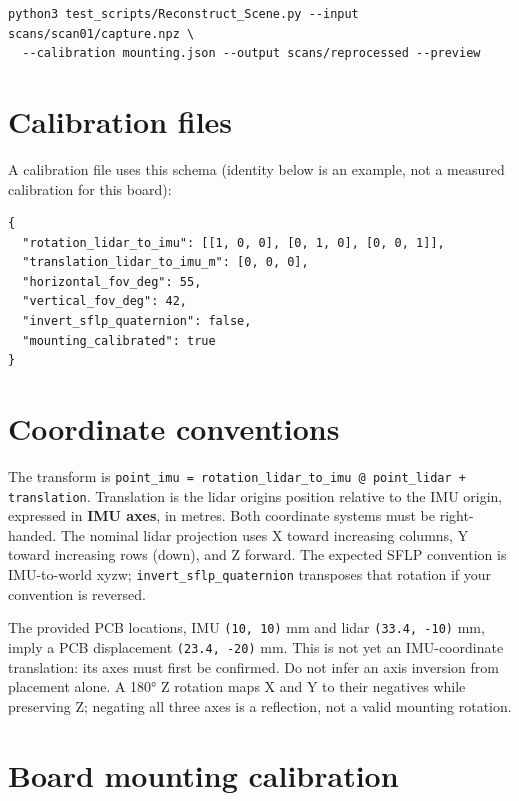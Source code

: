 \documentclass[10pt,a4paper,oneside]{report}
\begin{document}
\begin{verbatim}
python3 test_scripts/Reconstruct_Scene.py --input scans/scan01/capture.npz \
  --calibration mounting.json --output scans/reprocessed --preview
\end{verbatim}

\section{Calibration files}\label{wiki-tools-scene-reconstruction--calibration-files}

A calibration file uses this schema (identity below is an example, not a measured calibration for this board):

\begin{verbatim}
{
  "rotation_lidar_to_imu": [[1, 0, 0], [0, 1, 0], [0, 0, 1]],
  "translation_lidar_to_imu_m": [0, 0, 0],
  "horizontal_fov_deg": 55,
  "vertical_fov_deg": 42,
  "invert_sflp_quaternion": false,
  "mounting_calibrated": true
}
\end{verbatim}

\section{Coordinate conventions}\label{wiki-tools-scene-reconstruction--coordinate-conventions}

The transform is \texttt{point\_\allowbreak{}imu = rotation\_\allowbreak{}lidar\_\allowbreak{}to\_\allowbreak{}imu @ point\_\allowbreak{}lidar + translation}. Translation is the lidar origin\textquotesingle s position relative to the IMU origin, expressed in \textbf{IMU axes}, in metres. Both coordinate systems must be right-handed. The nominal lidar projection uses X toward increasing columns, Y toward increasing rows (down), and Z forward. The expected SFLP convention is IMU-to-world xyzw; \texttt{invert\_\allowbreak{}sflp\_\allowbreak{}quaternion} transposes that rotation if your convention is reversed.

The provided PCB locations, IMU \texttt{(10, 10)} mm and lidar \texttt{(33.\allowbreak{}4, -\allowbreak{}10)} mm, imply a PCB displacement \texttt{(23.\allowbreak{}4, -\allowbreak{}20)} mm. This is not yet an IMU-coordinate translation: its axes must first be confirmed. Do not infer an axis inversion from placement alone. A 180° Z rotation maps X and Y to their negatives while preserving Z; negating all three axes is a reflection, not a valid mounting rotation.

\section{Board mounting calibration}\label{wiki-tools-scene-reconstruction--board-mounting-calibration}
\end{document}
